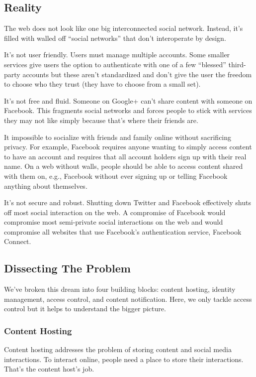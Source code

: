 \documentclass[pdftex,12pt,a4papaer,twoside,notitlepage]{report}
\begin{document}
\subsection{Reality}

The web does not look like one big interconnected social network. Instead, it's
filled with walled off ``social networks'' that don't interoperate by design.

It's not user friendly. Users must manage multiple accounts. Some smaller
services give users the option to authenticate with one of a few ``blessed''
third-party accounts but these aren't standardized and don't give the user the
freedom to choose who they trust (they have to choose from a small set).

It's not free and fluid. Someone on Google+ can't share content with someone on
Facebook. This fragments social networks and forces people to stick with
services they may not like simply because that's where their friends are.

It impossible to socialize with friends and family online without sacrificing
privacy. For example, Facebook requires anyone wanting to simply access content
to have an account and requires that all account holders sign up with their real
name. On a web without walls, people should be able to access content shared
with them on, e.g., Facebook without ever signing up or telling Facebook
anything about themselves.

It's not secure and robust. Shutting down Twitter and Facebook effectively shuts
off most social interaction on the web. A compromise of Facebook would
compromise most semi-private social interactions on the web and would compromise
all websites that use Facebook's authentication service, Facebook Connect.

\subsection{Dissecting The Problem}

We've broken this dream into four building blocks: content hosting, identity
management, access control, and content notification. Here, we only tackle
access control but it helps to understand the bigger picture.

\subsubsection{Content Hosting}

Content hosting addresses the problem of storing content and social media
interactions. To interact online, people need a place to store their
interactions. That's the content host's job.
\end{document}
